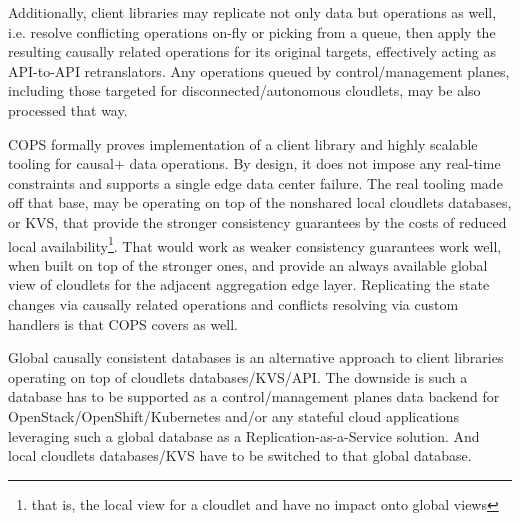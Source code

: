 \documentclass[conference]{IEEEtran}
\begin{document}
Additionally, client libraries may replicate not only data but operations as
well, i.e. resolve conflicting operations on-fly or picking from a queue, then
apply the resulting causally related operations for its original targets,
effectively acting as API-to-API retranslators. Any operations queued by
control/management planes, including those targeted for disconnected/autonomous
cloudlets, may be also processed that way.

COPS formally proves implementation of a client library and highly scalable
tooling for causal+ data operations. By design, it does not impose any
real-time constraints and supports a single edge data center failure. The real
tooling made off that base, may be operating on top of the nonshared local
cloudlets databases, or KVS, that provide the stronger consistency guarantees
by the costs of reduced local availability\footnote{that is, the local view for
a cloudlet and have no impact onto global views}. That would work as weaker
consistency guarantees work well, when built on top of the stronger ones, and
provide an always available global view of cloudlets for the adjacent
aggregation edge layer. Replicating the state changes via causally related
operations and conflicts resolving via custom handlers is that COPS covers as
well.

Global causally consistent databases\cite{b6} is an alternative approach to
client libraries operating on top of cloudlets databases/KVS/API.  The downside
is such a database has to be supported as a control/management planes data
backend for OpenStack/OpenShift/Kubernetes and/or any stateful cloud
applications leveraging such a global database as a Replication-as-a-Service
solution. And local cloudlets databases/KVS have to be switched to that global
database.
\end{document}
